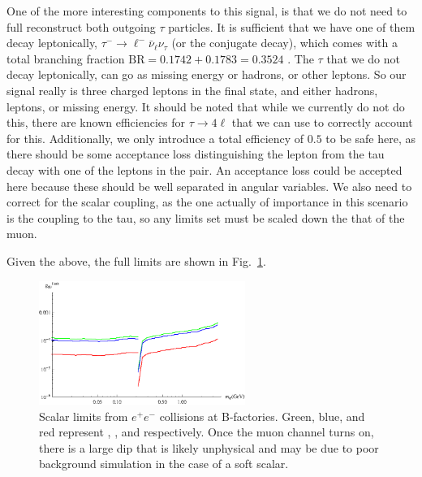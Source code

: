 One of the more interesting components to this signal, is that we do not need to full reconstruct both outgoing $\tau$ particles.
It is sufficient that we have one of them decay leptonically, $\tau^- \rightarrow \ell^- \bar{\nu}_\ell \nu_\tau$ (or the conjugate decay), which comes with a total branching fraction $\textrm{BR} = 0.1742 + 0.1783 = 0.3524$ \cite{Agashe:2014kda}.
The $\tau$ that we do not decay leptonically, can go as missing energy or hadrons, or other leptons.
So our signal really is three charged leptons in the final state, and either hadrons, leptons, or missing energy.
It should be noted that while we currently do not do this, there are known efficiencies for $\tau \rightarrow 4\ell$ that we can use to correctly account for this.
Additionally, we only introduce a total efficiency of $0.5$ to be safe here, as there should be some acceptance loss distinguishing the lepton from the tau decay with one of the leptons in the pair.
An acceptance loss could be accepted here because these should be well separated in angular variables.
We also need to correct for the scalar coupling, as the one actually of importance in this scenario is the coupling to the tau, so any limits set must be scaled down the that of the muon.

Given the above, the full limits are shown in Fig.\ \ref{fig:ee_limits}.

\begin{figure}[h]
    \centering
    \includegraphics[width=0.6\textwidth]{Figures/limits/ee_all}
    \caption{Scalar limits from $e^+ e^-$ collisions at B-factories. Green, blue, and red represent \babar, \belle, and \belletwo respectively. Once the muon channel turns on, there is a large dip that is likely unphysical and may be due to poor background simulation in the case of a soft scalar.}
    \label{fig:ee_limits}
\end{figure}
